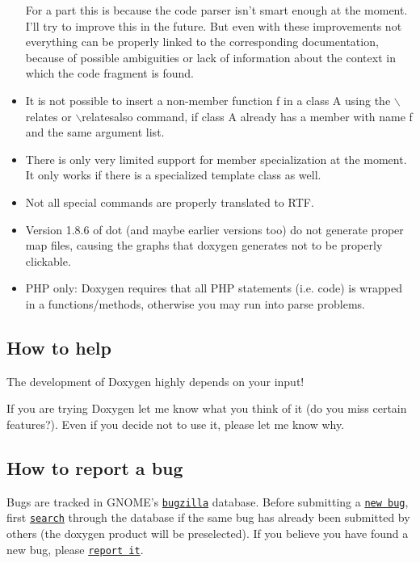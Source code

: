 \begin{itemize}
For a part this is because the code parser isn't smart enough at the moment. I'll try to improve this in the future. But even with these improvements not everything can be properly linked to the corresponding documentation, because of possible ambiguities or lack of information about the context in which the code fragment is found. \item It is not possible to insert a non-member function f in a class A using the $\backslash$relates or $\backslash$relatesalso command, if class A already has a member with name f and the same argument list. \item There is only very limited support for member specialization at the moment. It only works if there is a specialized template class as well. \item Not all special commands are properly translated to RTF. \item Version 1.8.6 of dot (and maybe earlier versions too) do not generate proper map files, causing the graphs that doxygen generates not to be properly clickable. \item PHP only: Doxygen requires that all PHP statements (i.e. code) is wrapped in a functions/methods, otherwise you may run into parse problems. \end{itemize}


\subsection*{How to help}

The development of Doxygen highly depends on your input!

If you are trying Doxygen let me know what you think of it (do you miss certain features?). Even if you decide not to use it, please let me know why.

\label{trouble_bug_reports}
\hypertarget{trouble_bug_reports}{}
 \subsection*{How to report a bug}

Bugs are tracked in GNOME's \href{http://bugzilla.gnome.org}{\tt bugzilla} database. Before submitting a \href{http://bugzilla.gnome.org/enter_bug.cgi?product=doxygen}{\tt new bug}, first \href{http://bugzilla.gnome.org/query.cgi?format=advanced&product=doxygen}{\tt search} through the database if the same bug has already been submitted by others (the doxygen product will be preselected). If you believe you have found a new bug, please \href{http://bugzilla.gnome.org/enter_bug.cgi?product=doxygen}{\tt report it}.

